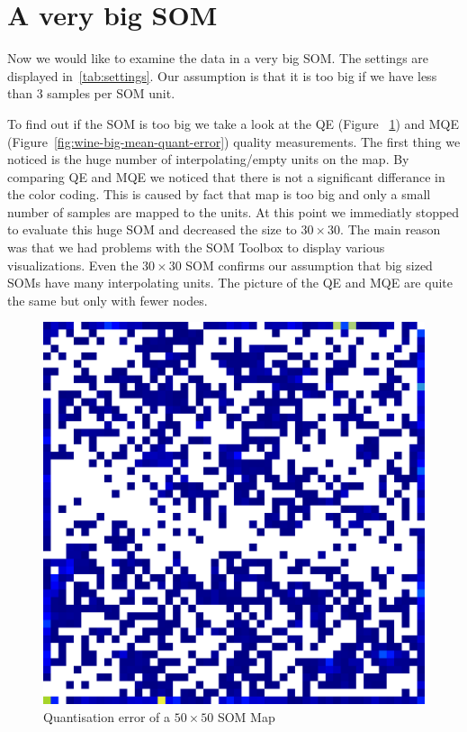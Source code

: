 \documentclass{acm_proc_article-sp}
\begin{document}
\section{A very big SOM}

Now we would like to examine the data in a very big SOM. The settings are displayed
in~\ref{tab:settings}. Our assumption is that it is too big if we have less than 3
samples per SOM unit.

To find out if the SOM is too big we take a look at the QE (Figure ~\ref{fig:wine-big-quant-error}) and MQE (Figure~\ref{fig:wine-big-mean-quant-error}) quality measurements.
The first thing we noticed is the huge number of interpolating/empty units on the map. By comparing QE and MQE we noticed that there is not
a significant differance in the color coding. This is caused by fact that map is too big and only a small number of samples
are mapped to the units.
At this point we immediatly stopped to evaluate this huge SOM and decreased the size to $30\times30$. The main reason was that we had problems
with the SOM Toolbox to display various visualizations. Even the $30\times30$ SOM confirms our assumption that big sized SOMs have
many interpolating units. The picture of the QE and MQE are quite the same but only with fewer nodes.


\begin{figure}
\centering
\includegraphics[width=\linewidth]{img/wine-big-quant-error}
\caption{Quantisation error of a $50\times50$ SOM Map}
\label{fig:wine-big-quant-error}
\end{figure}
\end{document}
